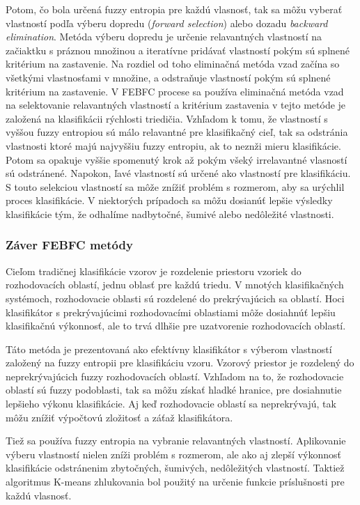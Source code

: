 Potom, čo bola určená fuzzy entropia pre každú vlasnosť, tak sa môžu vyberať vlastností podľa výberu dopredu (\textit{forward selection}) alebo dozadu \textit{backward elimination}. Metóda výberu dopredu je určenie relavantných vlastností na začiaktku s práznou množinou a iteratívne pridávať vlastností pokým sú splnené kritérium na zastavenie. Na rozdiel od toho eliminačná metóda vzad začína so všetkými vlastnosťami v množine, a odstraňuje vlastností pokým sú splnené kritérium na zastavenie.  
V FEBFC procese sa používa eliminačná metóda vzad na selektovanie relavantných vlastností a kritérium zastavenia v tejto metóde je založená na klasifikácii rýchlosti triedičia.  Vzhľadom k tomu, že vlastností s vyššou fuzzy entropiou sú málo relavantné pre klasifikačný cieľ, tak sa odstránia vlastnosti ktoré majú najvyššiu fuzzy entropiu, ak to neznži mieru klasifikácie. Potom sa opakuje vyššie spomenutý krok až pokým všeký irrelavantné vlasností sú odstránené. Napokon, ľavé vlastností sú určené ako vlastností pre klasifikáciu. 
S touto selekciou vlastností sa môže znížiť problém s rozmerom, aby sa urýchlil proces klasifikácie. V niektorých prípadoch sa môžu dosianúť lepšie výsledky klasifikácie tým, že odhalíme nadbytočné, šumivé alebo nedôležité vlastnosti. 

\subsubsection{Záver FEBFC metódy}
Cieľom tradičnej klasifikácie vzorov je rozdelenie priestoru vzoriek do rozhodovacích oblastí, jednu oblasť pre každú triedu. V mnotých klasifikačných systémoch, rozhodovacie oblasti sú rozdelené do prekrývajúcich sa oblastí. Hoci klasifikátor s prekrývajúcimi rozhodovacími oblastiami môže dosiahnúť lepšiu klasifikačnú výkonnosť, ale to trvá dlhšie pre uzatvorenie rozhodovacích oblastí. 

Táto metóda je prezentovaná ako efektívny klasifikátor s výberom vlastností založený na fuzzy entropii pre klasifikáciu vzoru. Vzorový priestor je rozdelený do neprekrývajúcich fuzzy rozhodovacích oblastí. Vzhľadom na to, že rozhodovacie oblastí sú fuzzy podoblasti, tak sa môžu získať hladké hranice, pre dosiahnutie lepšieho výkonu klasifikácie. Aj keď rozhodovacie oblastí sa neprekrývajú, tak môžu znížiť výpočtovú zložitosť a záťaž klasifikátora.  

Tiež sa používa fuzzy entropia na vybranie relavantných vlastností. Aplikovanie výberu vlastností nielen zníži problém s rozmerom, ale ako aj zlepší výkonnosť klasifikácie odstránenim zbytočných, šumivých, nedôležitých vlastností. Taktiež algoritmus K-means zhlukovania bol použitý na určenie funkcie príslušnosti pre každú vlasnosť. 



